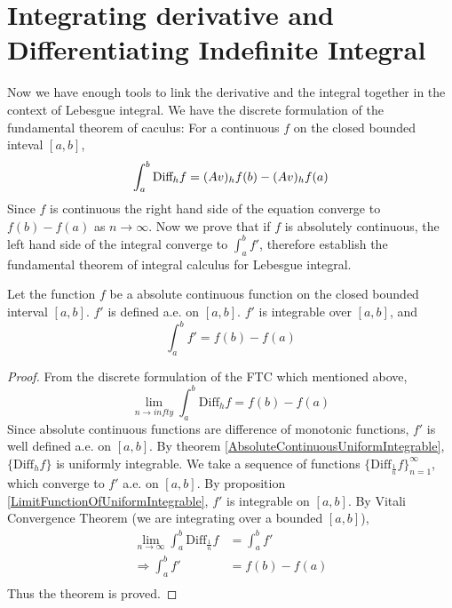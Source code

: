 \documentclass[lang=en, 12pt]{elegantbook}
\begin{document}
    \section{Integrating derivative and Differentiating Indefinite Integral}
        Now we have enough tools to link the derivative and the integral 
    together in the context of Lebesgue integral. We have the 
    discrete formulation of the fundamental theorem of caculus:
        For a continuous $f$ on the closed bounded inteval $[a,b]$,
    $$\int_a^b \mbox{Diff}_hf = \mbox(Av)_hf(b) - \mbox(Av)_hf(a)$$
        Since $f$ is continuous the right hand side of the equation 
    converge to $f(b)-f(a)$ as $n \to \infty$.
        Now we prove that if $f$ is absolutely continuous, the
    left hand side of the integral converge to $\int_a^b f'$, therefore
    establish the fundamental theorem of integral calculus for Lebesgue
    integral.
        \begin{theorem}\label{LebesgueFNCIntegration}
            Let the function $f$ be a absolute continuous function
        on the closed bounded interval $[a,b]$. $f'$ is defined 
        a.e. on $[a,b]$. $f'$ is integrable over $[a,b]$, and\
        \begin{equation}\label{FTCIntegralLebesgue}
            \int_a^b f' = f(b)-f(a)
        \end{equation}
        \end{theorem}
        \begin{proof}
            From the discrete formulation of the FTC which
        mentioned above, 
        \begin{equation*}
            \lim_{n \to infty} \int_a^b \mbox{Diff}_h f = f(b)- f(a)
        \end{equation*} 
            Since absolute continuous functions are difference of 
        monotonic functions, $f'$ is well defined a.e. on $[a,b]$.
        By theorem \ref{AbsoluteContinuousUniformIntegrable}, 
        $\{\mbox{Diff}_h f\}$ is uniformly integrable. We take a 
        sequence of functions $\{\mbox{Diff}_{\frac{1}{n}} f\}_{n=1}^{\infty}$,
        which converge to $f'$ a.e. on $[a,b]$. By proposition \ref{LimitFunctionOfUniformIntegrable},
        $f'$ is integrable on $[a,b]$. By Vitali Convergence Theorem
        (we are integrating over a bounded $[a,b]$),
        \begin{equation*}
            \begin{aligned}
                \lim_{n \to \infty} \int_a^b \mbox{Diff}_{\frac{1}{n}} f
                &= \int_a^b f' \\
                \Rightarrow \int_a^b f' &= f(b) -f(a)\\ 
            \end{aligned}
        \end{equation*}
        Thus the theorem is proved.
        \end{proof}
\end{document}
